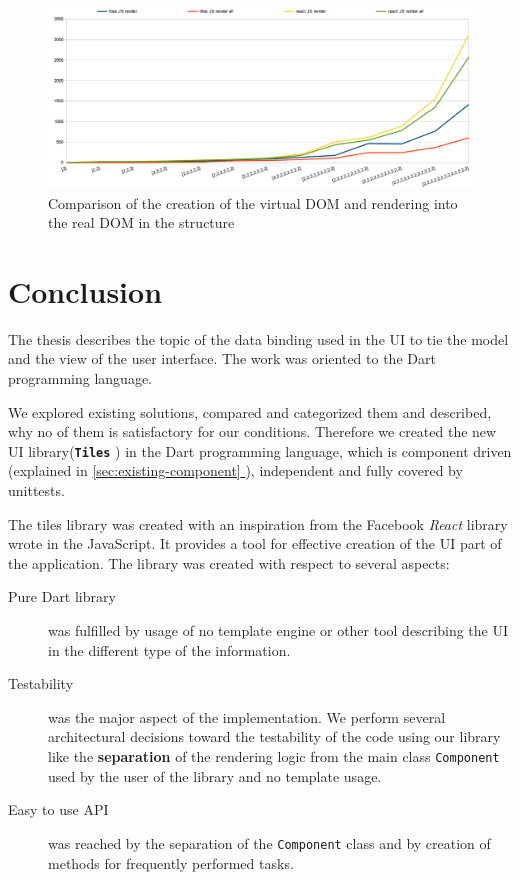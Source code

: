 \documentclass[oneside, 12pt]{book}
\newcommand*{\fullref}[1]{\hyperref[{#1}]{\autoref*{#1} \nameref*{#1}}}
\newcommand{\tiles}[0]{\textbf{\texttt{Tiles}} }
\newcommand{\react}[0]{\textit{React} }
\newcommand{\facebook}[0]{Facebook }
\begin{document}
	\begin{figure}[h]
	\centering  
		\includegraphics[scale=0.5]{images/benchmarks/s_render_all.png}
		\caption{Comparison of the creation of the virtual DOM and rendering into the real DOM in the structure}
		\label{img:benchmarks-structure-virtual-vs-real}
	\end{figure}



\pagestyle{plain}
\chapter*{Conclusion}\label{chap:conclusion}

The thesis describes the topic of the data binding used in the UI to tie the model and the view of the user interface.
The work was oriented to the Dart programming language. 

We explored existing solutions, compared and categorized them and described, why no of them is satisfactory for our conditions. 
	Therefore we created the new UI library(\tiles) in the Dart programming language, 
which is component driven (explained in \fullref{sec:existing-component}), 
independent and fully covered by unittests. 

The tiles library was created with an inspiration from the \facebook \react library wrote in the JavaScript.
It provides a tool for effective creation of the UI part of the application. 
The library was created with respect to several aspects:
\begin{description}
	\item[Pure Dart library] was fulfilled by usage of no template engine 
		or other tool describing the UI in the different type of the information.
	\item[Testability] was the major aspect of the implementation. 
		We perform several architectural decisions toward the testability of the code using our library like
		the \textbf{separation} of the rendering logic from the main class \texttt{Component} used by the user of the library
		and no template usage.
	\item[Easy to use API] was reached by the separation of the \texttt{Component} class 
		and by creation of methods for frequently performed tasks.
\end{description}
\end{document}
